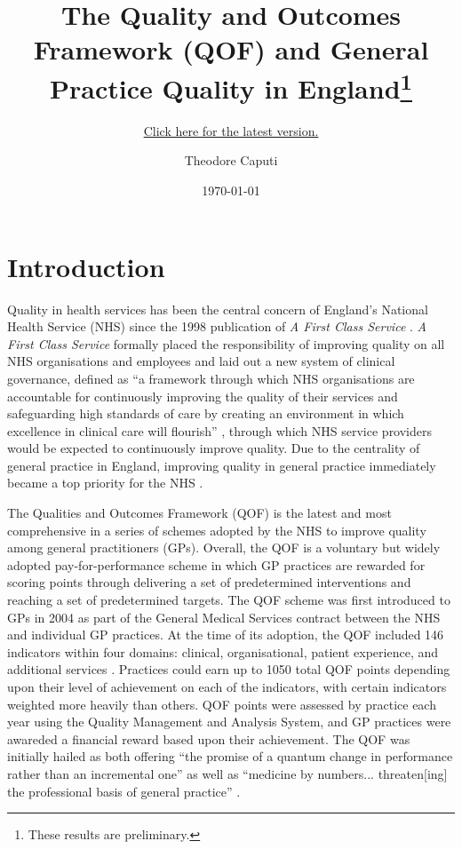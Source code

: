 \documentclass[12pt]{article}
\subtitle{\href{https://www.TheodoreCaputi.com/files/qof.pdf}{Click here for the latest version.}}
\title{The Quality and Outcomes Framework (QOF) and General Practice Quality in England\footnote{These results are preliminary.}}
\author{Theodore Caputi}
\date{\today}
\begin{document}
\maketitle

\tableofcontents
\newpage
\listoffigures
\newpage
\listoftables
\newpage

\section{Introduction}
\label{sec:litreviewintro}

Quality in health services has been the central concern of England's National Health Service (NHS) since the 1998 publication of \emph{A First Class Service} \citep{secretaryofstateforhealthFirstClassService1998}. \emph{A First Class Service} formally placed the responsibility of improving quality on all NHS organisations and employees and laid out a new system of clinical governance, defined as ``a framework through which NHS organisations are accountable for continuously improving the quality of their services and safeguarding high standards of care by creating an environment in which excellence in clinical care will flourish'' \citep{secretaryofstateforhealthFirstClassService1998}, through which NHS service providers would be expected to continuously improve quality. Due to the centrality of general practice in England, improving quality in general practice immediately became a top priority for the NHS \citep{bakerModelClinicalGovernance1999}.

The Qualities and Outcomes Framework (QOF) is the latest and most comprehensive in a series of schemes adopted by the NHS to improve quality among general practitioners (GPs). Overall, the QOF is a voluntary but widely adopted pay-for-performance scheme in which GP practices are rewarded for scoring points through delivering a set of predetermined interventions and reaching a set of predetermined targets. The QOF scheme was first introduced to GPs in 2004 as part of the General Medical Services contract between the NHS and individual GP practices. At the time of its adoption, the QOF included 146 indicators within four domains: clinical, organisational, patient experience, and additional services \citep{downingUKGovernmentNew2007}. Practices could earn up to 1050 total QOF points depending upon their level of achievement on each of the indicators, with certain indicators weighted more heavily than others. QOF points were assessed by practice each year using the Quality Management and Analysis System, and GP practices were awareded a financial reward based upon their achievement. The QOF was initially hailed as both offering ``the promise of a quantum change in performance rather than an incremental one'' \citep{shekelleNewContractGeneral2003} as well as ``medicine by numbers... threaten[ing] the professional basis of general practice'' \citep{lipmanHowWasIt2005}.
\end{document}
